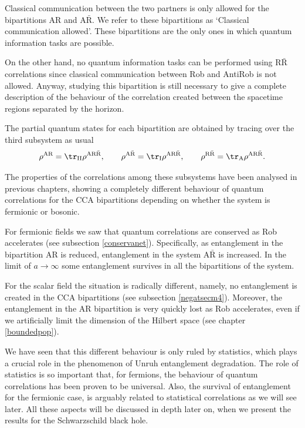  Classical communication between the two partners is only
allowed for the bipartitions AR and $\text{A}\bar{\text{R}}$. We refer to these bipartitions as  `Classical communication allowed'. These bipartitions are the only ones in which quantum information
tasks are possible.

On the other hand, no quantum information tasks can be performed using
$\text{R}\bar{\text{R}}$ correlations since classical communication
between Rob and AntiRob is not allowed. Anyway, studying this
bipartition is still necessary to give a complete description of the
behaviour of the correlation created between the spacetime regions
separated by the horizon.

The partial quantum states
for each bipartition are obtained by tracing over the third subsystem as usual
\begin{equation}\label{traza1}
\rho^{\text{AR}} = \tr_{{\text{II}}}\rho^{\text{AR}\bar{\text{R}}},\qquad \rho^{\text{A}\bar{\text{R}}} = \tr_{\text{I}}\rho^{\text{AR}\bar{\text{R}}},\qquad \rho^{\text{R}\bar{\text{R}}}=\tr_{\text{A}}\rho^{\text{AR}\bar{\text{R}}}.
\end{equation}

The properties of the correlations among these
subsystems have been analysed in previous chapters, showing a completely
different behaviour of quantum correlations for the CCA bipartitions
depending on whether the system is fermionic or bosonic.

For fermionic fields we saw that quantum correlations are conserved as Rob
accelerates (see subsection \ref{conservanet}). Specifically, as entanglement in the
bipartition AR is reduced, entanglement in the system
$\text{A}\bar{\text{R}}$ is increased. In the limit of
$a\rightarrow\infty$ some entanglement survives in all the bipartitions of
the system.

For the scalar field the situation is radically different, namely, no
entanglement is created in the CCA bipartitions (see subsection \ref{negatsecm4}). Moreover, the
entanglement in the AR bipartition is very quickly lost as Rob accelerates,
even if we artificially limit the dimension of the Hilbert space
(see chapter \ref{boundedpop}).

We have seen that this different behaviour is only ruled by statistics, which
plays a crucial role in the phenomenon of Unruh entanglement
degradation. The role of statistics is so important that, for fermions, the
behaviour of quantum correlations has been proven to be universal. Also, the survival of entanglement for the fermionic case, is
arguably related to statistical correlations as we will see later. All these
aspects will be discussed in depth later on, when we present the results
for the Schwarzschild black hole.


